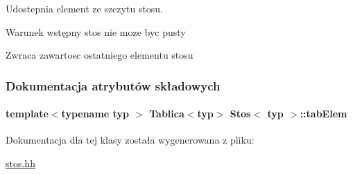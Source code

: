 Udostepnia element ze szczytu stosu. 

\begin{DoxyPrecond}{Warunek wstępny}
stos nie moze byc pusty 
\end{DoxyPrecond}
\begin{DoxyReturn}{Zwraca}
zawartosc ostatniego elementu stosu 
\end{DoxyReturn}


\subsubsection{Dokumentacja atrybutów składowych}
\hypertarget{class_stos_a8700a1da625f79ed8372b06994a22146}{
\paragraph[{tab\-Elem}]{\setlength{\rightskip}{0pt plus 5cm}template$<$typename typ $>$ {\bf Tablica}$<$typ$>$ {\bf Stos}$<$ typ $>$\-::tab\-Elem\hspace{0.3cm}{\ttfamily [private]}}}\label{class_stos_a8700a1da625f79ed8372b06994a22146}


Dokumentacja dla tej klasy została wygenerowana z pliku\-:\begin{DoxyCompactItemize}
\item 
\hyperlink{stos_8hh}{stos.\-hh}\end{DoxyCompactItemize}
